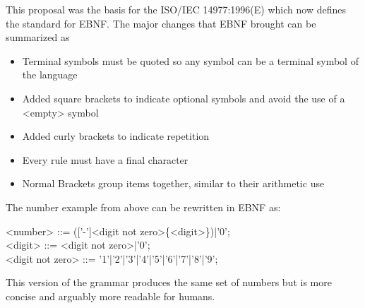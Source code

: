 This proposal was the basis for the ISO/IEC 14977:1996(E) which now defines the standard for \ac{EBNF}. The major changes that \ac{EBNF} brought can be summarized as \parencite[cf.][p. VI]{isoiec_149771996e_information_1996}
\begin{itemize}[noitemsep]
    \item Terminal symbols must be quoted so any symbol can be a terminal symbol of the language
    \item Added square brackets to indicate optional symbols and avoid the use of a <empty> symbol
    \item Added curly brackets to indicate repetition
    \item Every rule must have a final character
    \item Normal Brackets group items together, similar to their arithmetic use
\end{itemize}
The number example from above can be rewritten in \ac{EBNF} as:
\begin{grammar}
    <number> ::= (['-']<digit not zero>\{<digit>\})|'0'; \\
    <digit> ::= <digit not zero>|'0'; \\
    <digit not zero> ::= '1'|'2'|'3'|'4'|'5'|'6'|'7'|'8'|'9';
\end{grammar}
This version of the grammar produces the same set of numbers but is more concise and arguably more readable for humans.
